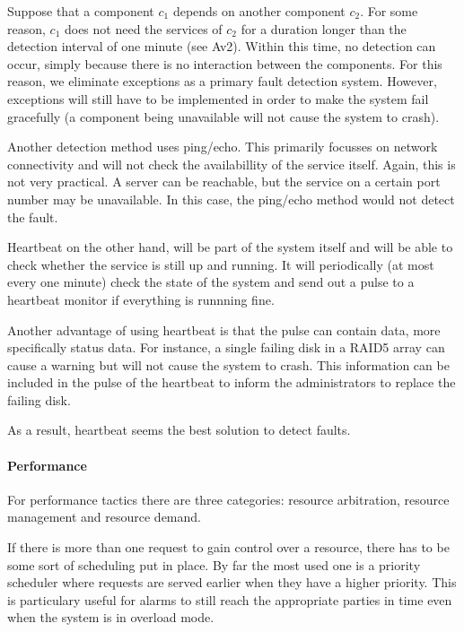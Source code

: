 \npar Suppose that a component $c_1$ depends on another component $c_2$. For
some reason, $c_1$ does not need the services of $c_2$ for a duration longer
than the detection interval of one minute (see Av2). Within this time,
no detection can occur, simply because there is no interaction between the
components. For this reason, we eliminate exceptions as a primary fault
detection system. However, exceptions will still have to be implemented in order
to make the system fail gracefully (a component being unavailable will not
cause the system to crash).

\npar Another detection method uses ping/echo. This primarily focusses on
network connectivity and will not check the availabillity of the service itself.
Again, this is not very practical. A server can be reachable, but the service on
a certain port number may be unavailable. In this case, the ping/echo
method would not detect the fault.

\npar Heartbeat on the other hand, will be part of the system itself and will be
able to check whether the service is still up and running. It will periodically
(at most every one minute) check the state of the system and send out a pulse
to a heartbeat monitor if everything is runnning fine.

\npar Another advantage of using heartbeat is that the pulse can contain data,
more specifically status data. For instance, a single failing disk in a RAID5
array can cause a warning but will not cause the system to crash. This
information can be included in the pulse of the heartbeat to inform the
administrators to replace the failing disk.

\npar As a result, heartbeat seems the best solution to detect faults.

\paragraph{Performance}

\npar For performance tactics there are three categories: resource
arbitration, resource management and resource demand.

\npar If there is more than one request to gain control over a resource, there
has to be some sort of scheduling put in place. By far the most used one is a
priority scheduler where requests are served earlier when they have a higher priority.
This is particulary useful for alarms to still reach the appropriate parties in
time even when the system is in overload mode. 


